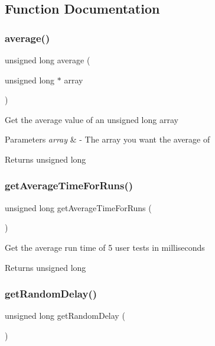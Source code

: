 \subsection{Function Documentation}
\mbox{\label{test_8ino_a3f58cad8e546d58d8d275655e22964c9}} 
\subsubsection{\texorpdfstring{average()}{average()}}
{\footnotesize\ttfamily unsigned long average (\begin{DoxyParamCaption}\item[{unsigned long $\ast$}]{array }\end{DoxyParamCaption})}

Get the average value of an unsigned long array 
\begin{DoxyParams}{Parameters}
{\em array} & -\/ The array you want the average of \\
\hline
\end{DoxyParams}
\begin{DoxyReturn}{Returns}
unsigned long 
\end{DoxyReturn}
\mbox{\label{test_8ino_a3991b3fec82a370bed6f323e5496ba34}} 
\subsubsection{\texorpdfstring{getAverageTimeForRuns()}{getAverageTimeForRuns()}}
{\footnotesize\ttfamily unsigned long get\+Average\+Time\+For\+Runs (\begin{DoxyParamCaption}{ }\end{DoxyParamCaption})}

Get the average run time of 5 user tests in milliseconds \begin{DoxyReturn}{Returns}
unsigned long 
\end{DoxyReturn}
\mbox{\label{test_8ino_acfe46c2625596d6b059364eae0d9de41}} 
\subsubsection{\texorpdfstring{getRandomDelay()}{getRandomDelay()}}
{\footnotesize\ttfamily unsigned long get\+Random\+Delay (\begin{DoxyParamCaption}{ }\end{DoxyParamCaption})}

